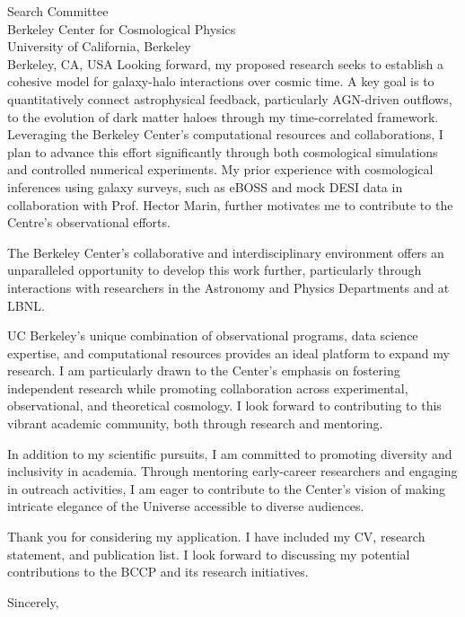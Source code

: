 \documentclass[11pt]{letter}
\begin{document}
\begin{letter}{Search Committee \\ Berkeley Center for Cosmological Physics \\ University of California, Berkeley \\ Berkeley, CA, USA}
Looking forward, my proposed research seeks to establish a cohesive model for galaxy-halo interactions over cosmic time. A key goal is to quantitatively connect astrophysical feedback, particularly AGN-driven outflows, to the evolution of dark matter haloes through my time-correlated framework. Leveraging the Berkeley Center's computational resources and collaborations, I plan to advance this effort significantly through both cosmological simulations and controlled numerical experiments. My prior experience with cosmological inferences using galaxy surveys, such as eBOSS and mock DESI data in collaboration with Prof. Hector Marin, further motivates me to contribute to the Centre's observational efforts.

The Berkeley Center’s collaborative and interdisciplinary environment offers an unparalleled opportunity to develop this work further, particularly through interactions with researchers in the Astronomy and Physics Departments and at LBNL.

UC Berkeley's unique combination of observational programs, data science expertise, and computational resources provides an ideal platform to expand my research. I am particularly drawn to the Center's emphasis on fostering independent research while promoting collaboration across experimental, observational, and theoretical cosmology. I look forward to contributing to this vibrant academic community, both through research and mentoring.

In addition to my scientific pursuits, I am committed to promoting diversity and inclusivity in academia. Through mentoring early-career researchers and engaging in outreach activities, I am eager to contribute to the Center's vision of making intricate elegance of the Universe accessible to diverse audiences.

Thank you for considering my application. I have included my CV, research statement, and publication list. I look forward to discussing my potential contributions to the BCCP and its research initiatives.

\closing{Sincerely,}

\end{letter}
\end{document}
